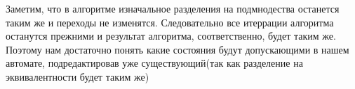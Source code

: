 \documentclass[a4paper,12pt]{article}
\begin{document}
Заметим, что в алгоритме изначальное разделения на подмнодества останется таким же и переходы не изменятся. Следовательно все итеррации алгоритма останутся прежними и результат алгоритма, соответственно, будет таким же. Поэтому нам достаточно понять какие состояния будут допускающими в нашем автомате, подредактировав уже существующий(так как разделение на эквивалентности  будет таким же)\\
\begin{center} 
\end{center}
\end{document}
